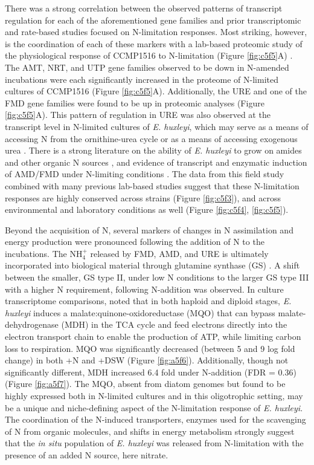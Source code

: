 There was a strong correlation between the observed patterns of transcript regulation for each of the aforementioned gene families and prior transcriptomic \citep{Rokitta2014} and rate-based \citep{Palenik1997, Bruhn2010} studies focused on N-limitation responses. Most striking, however, is the coordination of each of these markers with a lab-based proteomic study of the physiological response of CCMP1516 to N-limitation (Figure \ref{fig:c5f5}A) \citep{McKew2015}. The AMT, NRT, and UTP gene families observed to be down in N-amended incubations were each significantly increased in the proteome of N-limited cultures of CCMP1516 (Figure \ref{fig:c5f5}A).  Additionally, the URE and one of the FMD gene families were found to be up in proteomic analyses (Figure \ref{fig:c5f5}A). This pattern of regulation in URE was also observed at the transcript level in N-limited cultures of \textit{E. huxleyi}, which may serve as a means of accessing N from the ornithine-urea cycle \citep{Rokitta2014} or as a means of accessing exogenous urea \citep{Dyhrman2003a}. There is a strong literature on the ability of \textit{E. huxleyi} to grow on amides and other organic N sources \citep{Palenik1997}, and evidence of transcript and enzymatic induction of AMD/FMD under N-limiting conditions \citep{Bruhn2010, Palenik1997}. The data from this field study combined with many previous lab-based studies suggest that these N-limitation responses are highly conserved across strains (Figure \ref{fig:c5f3}), and across environmental and laboratory conditions as well (Figure \ref{fig:c5f4}, \ref{fig:c5f5}).\par


Beyond the acquisition of N, several markers of changes in N assimilation and energy production were pronounced following the addition of N to the incubations. The NH$_{4}^+$ released by FMD, AMD, and URE is ultimately incorporated into biological material through glutamine synthase (GS) \citep{Rokitta2014}. A shift between the smaller, GS type II, under low N conditions to the larger GS type III with a higher N requirement, following N-addition was observed. In culture transcriptome comparisons, \citet{Rokitta2014} noted that in both haploid and diploid stages, \textit{E. huxleyi} induces a malate:quinone-oxidoreductase (MQO) that can bypass malate-dehydrogenase (MDH) in the TCA cycle and feed electrons directly into the electron transport chain to enable the production of ATP, while limiting carbon loss to respiration. MQO was significantly decreased (between 5 and 9 log fold change) in both +N and +DSW (Figure \ref{fig:a5f6}). Additionally, though not significantly different, MDH increased 6.4 fold under N-addition (FDR = 0.36) (Figure \ref{fig:a5f7}). The MQO, absent from diatom genomes but found to be highly expressed both in N-limited cultures and in this oligotrophic setting, may be a unique and niche-defining aspect of the N-limitation response of \textit{E. huxleyi}. The coordination of the N-induced transporters, enzymes used for the scavenging of N from organic molecules, and shifts in energy metabolism strongly suggest that the \textit{in situ} population of \textit{E. huxleyi} was released from N-limitation with the presence of an added N source, here nitrate.\par

